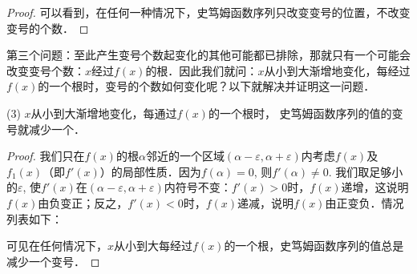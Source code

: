 \begin{proof}
可以看到，在任何一种情况下，史笃姆函数序列只改变变号的位置，不改变变号的个数．
\end{proof}

第三个问题：至此产生变号个数起变化的其他可能都已排除，那就只有一个可能会改变变号个数：$x$经过$f(x)$的根．因此我们就问：$x$从小到大渐增地变化，每经过$f(x)$的一个根时，变号的个数如何变化呢？以下就解决并证明这一问题．

\begin{blk}{}
(3) $x$从小到大渐增地变化，每通过$f(x)$的一个根时，
史笃姆函数序列的值的变号就减少一个．
\end{blk}

\begin{proof}
我们只在$f(x)$的根$\alpha$邻近的一个区域$(\alpha-\varepsilon,\alpha+\varepsilon)$内考虑$f(x)$及$f_1(x)$（即$f'(x)$）的局部性质．因为$f(\alpha)=0$,
则$f'(\alpha)\ne 0$. 我们取足够小的$\varepsilon$, 使$f'(x)$在$(\alpha-\varepsilon,\alpha+\varepsilon)$内符号不变：$f'(x)>0$时，$f(x)$递增，这说明$f(x)$由负变正；反之，$f'(x)<0$时，$f(x)$递减，说明$f(x)$由正变负．情况列表如下：
\begin{center}
    \end{center}

可见在任何情况下，$x$从小到大每经过$f(x)$的一个根，史笃姆函数序列的值总是减少一个变号．
\end{proof}

